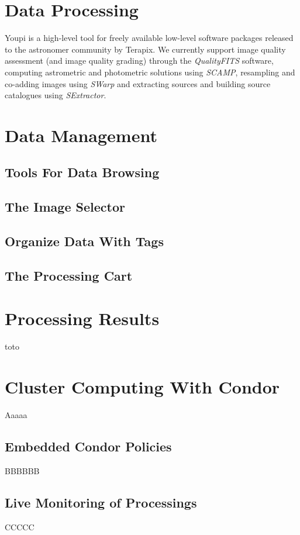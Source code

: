 \documentclass[11pt,twoside]{article}  %
\begin{document}
\section{Data Processing}

Youpi is a high-level tool for freely available low-level software packages released 
to the astronomer community by Terapix. We currently support image quality assessment 
(and image quality grading) through the \emph{QualityFITS} software, computing astrometric 
and photometric solutions using \emph{SCAMP}, resampling and co-adding images using \emph{SWarp} 
and extracting sources and building source catalogues using \emph{SExtractor}.

\section{Data Management}
\subsection{Tools For Data Browsing}
\subsection{The Image Selector}\label{sec:ims}
\subsection{Organize Data With Tags}
\subsection{The Processing Cart}

\section{Processing Results}

toto

\section{Cluster Computing With Condor}
Aaaaa
\subsection{Embedded Condor Policies}
BBBBBB
\subsection{Live Monitoring of Processings}
CCCCC
\end{document}
